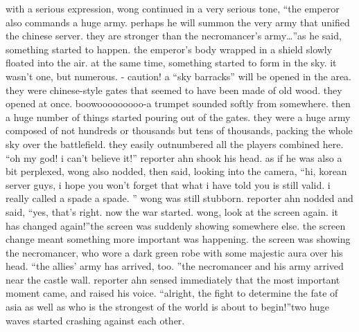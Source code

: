 with a serious expression, wong continued in a very serious tone, “the emperor also commands a huge army.
 perhaps he will summon the very army that unified the chinese server.
 they are stronger than the necromancer’s army…”as he said, something started to happen.
the emperor’s body wrapped in a shield slowly floated into the air.
 at the same time, something started to form in the sky.
 it wasn’t one, but numerous.
- caution! a “sky barracks” will be opened in the area.
they were chinese-style gates that seemed to have been made of old wood.
 they opened at once.
boowooooooooo-a trumpet sounded softly from somewhere.
then a huge number of things started pouring out of the gates.
they were a huge army composed of not hundreds or thousands but tens of thousands, packing the whole sky over the battlefield.
 they easily outnumbered all the players combined here.
“oh my god! i can’t believe it!” reporter ahn shook his head.
as if he was also a bit perplexed, wong also nodded, then said, looking into the camera, “hi, korean server guys, i hope you won’t forget that what i have told you is still valid.
 i really called a spade a spade.
” wong was still stubborn.
reporter ahn nodded and said, “yes, that’s right.
 now the war started.
 wong, look at the screen again.
 it has changed again!”the screen was suddenly showing somewhere else.
 the screen change meant something more important was happening.
the screen was showing the necromancer, who wore a dark green robe with some majestic aura over his head.
“the allies’ army has arrived, too.
”the necromancer and his army arrived near the castle wall.
reporter ahn sensed immediately that the most important moment came, and raised his voice.
“alright, the fight to determine the fate of asia as well as who is the strongest of the world is about to begin!”two huge waves started crashing against each other.


 